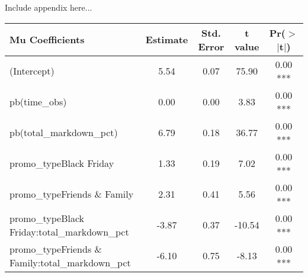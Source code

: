 
Include appendix here...


\begin{table}[H]
\centering
\begin{tabular}{|l|c|c|c|c|}
  \hline
  \rowcolor{lightgray}
 \textbf{Mu Coefficients} & \textbf{Estimate} & \textbf{Std. Error} & \textbf{t value} & \textbf{Pr($>$$|$t$|$)} \\ 
  \hline
(Intercept) & 5.54 & 0.07 & 75.90 & 0.00 *** \\ \hline
  pb(time\_obs) & 0.00 & 0.00 & 3.83 & 0.00 *** \\ \hline
  pb(total\_markdown\_pct) & 6.79 & 0.18 & 36.77 & 0.00 *** \\ \hline
  promo\_typeBlack Friday & 1.33 & 0.19 & 7.02 & 0.00 *** \\ \hline
  promo\_typeFriends \& Family & 2.31 & 0.41 & 5.56 & 0.00 *** \\ \hline
  promo\_typeBlack Friday:total\_markdown\_pct & -3.87 & 0.37 & -10.54 & 0.00 *** \\ \hline
  promo\_typeFriends \& Family:total\_markdown\_pct & -6.10 & 0.75 & -8.13 & 0.00 *** \\ \hline
\end{tabular}
\end{table}